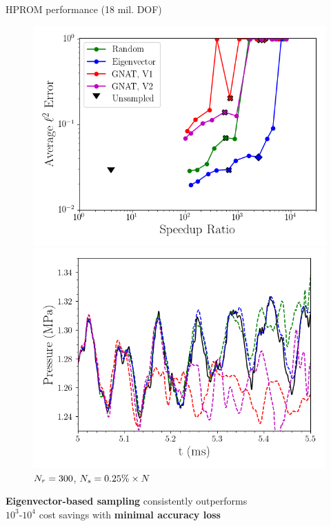 \documentclass[]{beamer}
\begin{document}
\begin{frame}{HPROM performance (18 mil. DOF)}
	\begin{figure}
		\begin{minipage}{0.49\linewidth}
			\includegraphics[width=0.99\linewidth]{Images/experiments/cvrc/sampled_dt5e-7_Average_errorRaw_pareto.png}
			\caption*{$\dt = 5 \times \dtFOM$}
		\end{minipage}
		\begin{minipage}{0.49\linewidth}
			\includegraphics[width=0.99\linewidth]{Images/experiments/cvrc/pressure_probe_deim_dt5e-7_samp0p0025.png}
			\caption*{$N_r = 300$, $N_s = 0.25\% \times N$}
		\end{minipage}
	\end{figure}
	\begin{tcolorbox}[colframe=blue!50!white,halign=center]
		\textbf{Eigenvector-based sampling} consistently outperforms \\
		$10^3$-$10^4$ cost savings with \textbf{minimal accuracy loss}
	\end{tcolorbox}
\end{frame}
\end{document}
